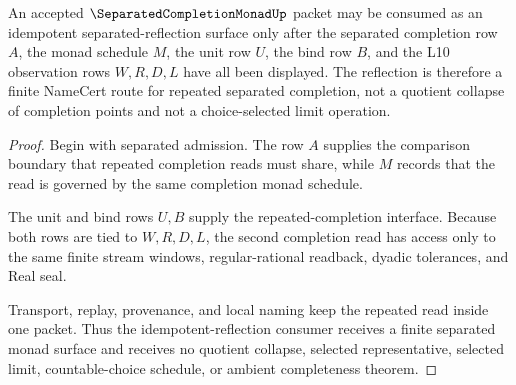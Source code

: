 \begin{theorem}
\label{thm:separated-completion-monad-idempotent-reflection}
An accepted $\SeparatedCompletionMonadUp$ packet may be consumed as an idempotent separated-reflection surface only after the separated completion row $A$, the monad schedule $M$, the unit row $U$, the bind row $B$, and the L10 observation rows $W,R,D,L$ have all been displayed. The reflection is therefore a finite NameCert route for repeated separated completion, not a quotient collapse of completion points and not a choice-selected limit operation.
\end{theorem}
\begin{proof}
Begin with separated admission. The row $A$ supplies the comparison boundary that repeated completion reads must share, while $M$ records that the read is governed by the same completion monad schedule.

The unit and bind rows $U,B$ supply the repeated-completion interface. Because both rows are tied to $W,R,D,L$, the second completion read has access only to the same finite stream windows, regular-rational readback, dyadic tolerances, and Real seal.

Transport, replay, provenance, and local naming keep the repeated read inside one packet. Thus the idempotent-reflection consumer receives a finite separated monad surface and receives no quotient collapse, selected representative, selected limit, countable-choice schedule, or ambient completeness theorem.
\end{proof}

